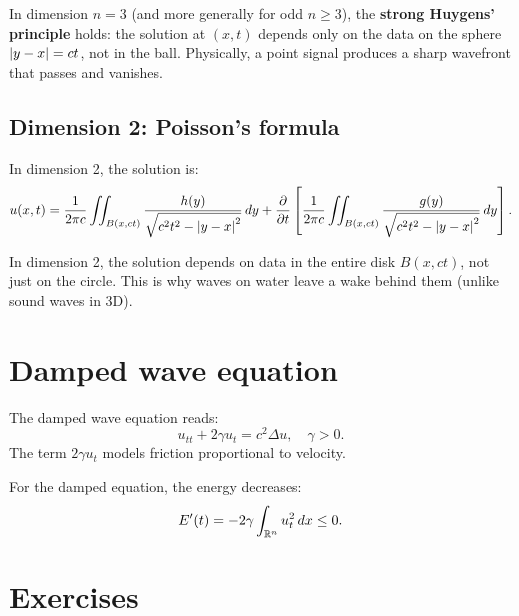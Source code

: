 \begin{theorem}
In dimension $n = 3$ (and more generally for odd $n \geq 3$), the
\textbf{strong Huygens' principle} holds: the solution at $(x,t)$
depends only on the data on the sphere $\left| y-x \right| = ct$, not in the ball.
Physically, a point signal produces a sharp wavefront that passes and
vanishes.
\end{theorem}

\subsection{Dimension 2: Poisson's formula}

\begin{theorem}
In dimension 2, the solution is:
\begin{equation}\label{eq:poisson_wave_2d}
    u(x,t) = \frac{1}{2\pi c}\iint_{B(x,ct)}
    \frac{h(y)}{\sqrt{c^2 t^2 - \left| y-x \right|^2}}\, dy
    + \frac{\partial}{\partial t}\left[\frac{1}{2\pi c}\iint_{B(x,ct)}
    \frac{g(y)}{\sqrt{c^2 t^2 - \left| y-x \right|^2}}\, dy\right].
\end{equation}
\end{theorem}

\begin{warning}[title=\textbf{No Huygens' principle in even dimensions}]
In dimension 2, the solution depends on data in the entire disk $B(x,ct)$,
not just on the circle. This is why waves on water leave a wake behind
them (unlike sound waves in 3D).
\end{warning}

\section{Damped wave equation}

The damped wave equation reads:
\[
    u_{tt} + 2\gamma u_t = c^2 \Delta u, \quad \gamma > 0.
\]
The term $2\gamma u_t$ models friction proportional to velocity.

\begin{proposition}
For the damped equation, the energy decreases:
\[
    E'(t) = -2\gamma \int_{\mathbb{R}^n} u_t^2\, dx \leq 0.
\]
\end{proposition}

\section{Exercises}

